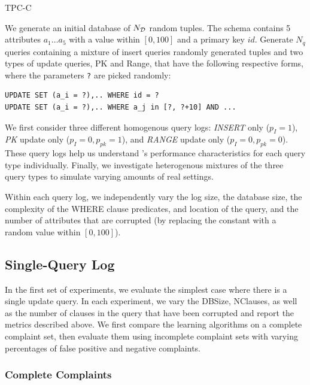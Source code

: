 TPC-C


We generate an initial database of $N_{\cal D}$ random tuples.  
The schema contains 5 attributes $a_1\ldots a_5$ with a value
within $[0, 100]$ and a primary key $id$. 
Generate $N_q$ queries containing a mixture of insert queries  randomly generated tuples and two types of update
queries, PK and Range, that have the following respective forms, 
where the parameters \verb|?| are picked randomly:

{\scriptsize
\begin{verbatim}
UPDATE SET (a_i = ?),.. WHERE id = ?
UPDATE SET (a_i = ?),.. WHERE a_j in [?, ?+10] AND ...
\end{verbatim}
}

We first consider three different homogenous query logs: {\it INSERT} only ($p_I = 1$), 
{\it PK} update only ($p_I = 0, p_{pk} = 1$), and {\it RANGE} update only ($p_I = 0, p_{pk} = 0$).
These query logs help us understand \sys's performance characteristics for each query type individually.  
Finally, we investigate heterogenous mixtures of the three query types to simulate varying amounts of real settings.

Within each query log, we independently vary the log size, the
database size, the complexity of the WHERE clause predicates, and
location of the query, and the number of attributes that are corrupted
(by replacing the constant with a random value within $[0, 100]$).





\subsection{Single-Query Log}

In the first set of experiments, we evaluate the simplest case where there
is a single update query.  In each experiment, we vary the DBSize,
NClauses, as well as the number of clauses in the query that have
been corrupted and report the metrics described above.  We first 
compare the learning algorithms on a complete complaint set, then evaluate them
using incomplete complaint sets with varying percentages of false positive and negative complaints.

\subsubsection{Complete Complaints}

